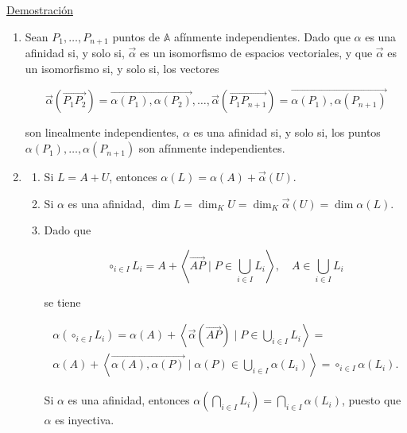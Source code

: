 \documentclass[12pt, a4paper, ones, notitlepage, openany,titlepage]{article}
\newcommand{\demostracion}{\noindent\underline{Demostración}}
\begin{document}
\demostracion 
\begin{enumerate}[label=(\arabic*)]
	
	\item Sean $P_{1}, \ldots, P_{n+1}$ puntos de $\mathbb{A}$ afínmente independientes. Dado que $\alpha$ es una afinidad si, y solo si, $\overrightarrow{\alpha}$ es un isomorfismo de espacios vectoriales, y que $\overrightarrow{\alpha}$ es un isomorfismo si, y solo si, los vectores
	
	$$
	\overrightarrow{\alpha}\left(\overrightarrow{P_{1} P_{2}}\right)=\overrightarrow{\alpha\left(P_{1}\right), \alpha\left(P_{2}\right)}, \ldots, \overrightarrow{\alpha}\left(\overrightarrow{P_{1} P_{n+1}}\right)=\overrightarrow{\alpha\left(P_{1}\right), \alpha\left(P_{n+1}\right)}
	$$
	
	son linealmente independientes, $\alpha$ es una afinidad si, y solo si, los puntos $\alpha\left(P_{1}\right), \ldots, \alpha\left(P_{n+1}\right)$ son afínmente independientes.
	
	\item 
	\begin{enumerate}[label=(\alph*)]
		\item Si $L=A+U$, entonces $\alpha(L)=\alpha(A)+\overrightarrow{\alpha}(U)$.
		
		\item Si $\alpha$ es una afinidad, $\dim  L=\dim _{K} U=\dim _{K} \overrightarrow{\alpha}(U)=\dim  \alpha(L)$.
		
		\item Dado que
		
		$$
		\circ_{i \in I} L_{i}=A+\left\langle\overrightarrow{A P} \mid P \in \bigcup_{i \in I} L_{i}\right\rangle, \quad A \in \bigcup_{i \in I} L_{i}
		$$
		
		se tiene
		
		\begin{gather*}
			\alpha\left(\circ_{i \in I} L_{i}\right)=\alpha(A)+\left\langle\overrightarrow{\alpha}(\overrightarrow{A P}) \mid P \in \bigcup_{i \in I} L_{i}\right\rangle=\\
			\alpha(A)+\left\langle\overrightarrow{\alpha(A), \alpha(P)} \mid \alpha(P) \in \bigcup_{i \in I} \alpha\left(L_{i}\right)\right\rangle=\circ_{i \in I} \alpha\left(L_{i}\right) .
		\end{gather*}
		
		Si $\alpha$ es una afinidad, entonces $\alpha\left(\bigcap_{i \in I} L_{i}\right)=\bigcap_{i \in I} \alpha\left(L_{i}\right)$, puesto que $\alpha$ es inyectiva.
		

\end{enumerate}
\end{enumerate}
\end{document}
